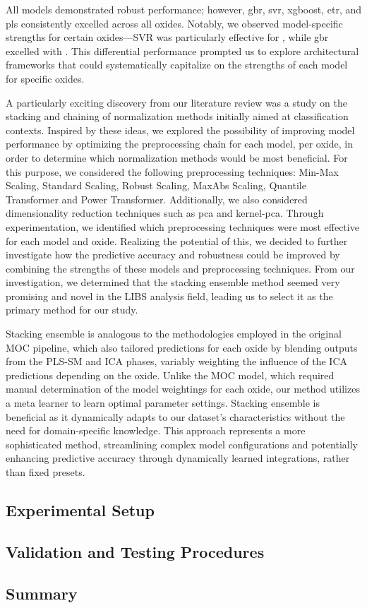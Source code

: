 All models demonstrated robust performance; however, \gls{gbr}, \gls{svr}, \gls{xgboost}, \gls{etr}, and \gls{pls} consistently excelled across all oxides. 
Notably, we observed model-specific strengths for certain oxides—SVR was particularly effective for , while \gls{gbr} excelled with . 
This differential performance prompted us to explore architectural frameworks that could systematically capitalize on the strengths of each model for specific oxides.

A particularly exciting discovery from our literature review was a study on the stacking and chaining of normalization methods initially aimed at classification contexts. 
Inspired by these ideas, we explored the possibility of improving model performance by optimizing the preprocessing chain for each model, per oxide, in order to determine which normalization methods would be most beneficial.
For this purpose, we considered the following preprocessing techniques: Min-Max Scaling, Standard Scaling, Robust Scaling, MaxAbs Scaling, Quantile Transformer and Power Transformer. 
Additionally, we also considered dimensionality reduction techniques such as \gls{pca} and \gls{kernel-pca}.
Through experimentation, we identified which preprocessing techniques were most effective for each model and oxide. 
Realizing the potential of this, we decided to further investigate how the predictive accuracy and robustness could be improved by combining the strengths of these models and preprocessing techniques.
From our investigation, we determined that the stacking ensemble method seemed very promising and novel in the LIBS analysis field, leading us to select it as the primary method for our study.

Stacking ensemble is analogous to the methodologies employed in the original MOC pipeline, which also tailored predictions for each oxide by blending outputs from the PLS-SM and ICA phases, variably weighting the influence of the ICA predictions depending on the oxide.
Unlike the MOC model, which required manual determination of the model weightings for each oxide, our method utilizes a meta learner to learn optimal parameter settings. 
Stacking ensemble is beneficial as it dynamically adapts to our dataset's characteristics without the need for domain-specific knowledge.
This approach represents a more sophisticated method, streamlining complex model configurations and potentially enhancing predictive accuracy through dynamically learned integrations, rather than fixed presets.

\subsection{Experimental Setup}

\subsection{Validation and Testing Procedures}


\subsection{Summary}
